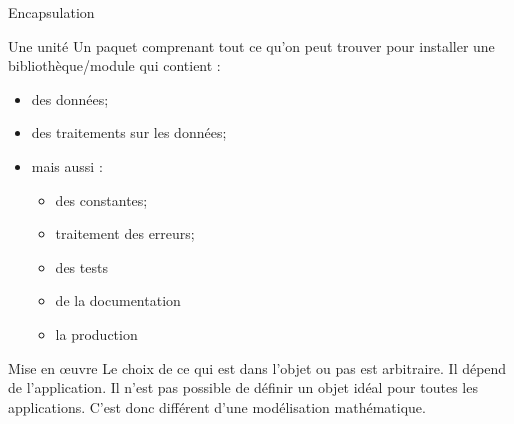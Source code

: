 \documentclass[compress,10pt,aspectratio=169]{beamer}
\begin{document}
\begin{frame}{Encapsulation}
  \scriptsize
  \begin{block}{\scriptsize Une unité}
  Un paquet comprenant tout ce qu'on peut trouver pour installer une bibliothèque/module qui contient :
  \begin{itemize}
  \item des données;
  \item des traitements sur les données;
  \item mais aussi :
  \begin{itemize}
  \scriptsize
  \item des constantes;
  \item traitement des erreurs;
  \item des tests
  \item de la documentation
  \item la production
  \end{itemize}
  \end{itemize}
  \end{block}
  
  \begin{block}{\small Mise en {\oe}uvre}
  Le choix de ce qui est dans l'objet ou pas est arbitraire. Il dépend de l'application. Il n'est pas possible de définir un objet idéal pour toutes les applications. C'est donc différent d'une modélisation mathématique.
  \end{block}
  \end{frame}
  
\end{document}
